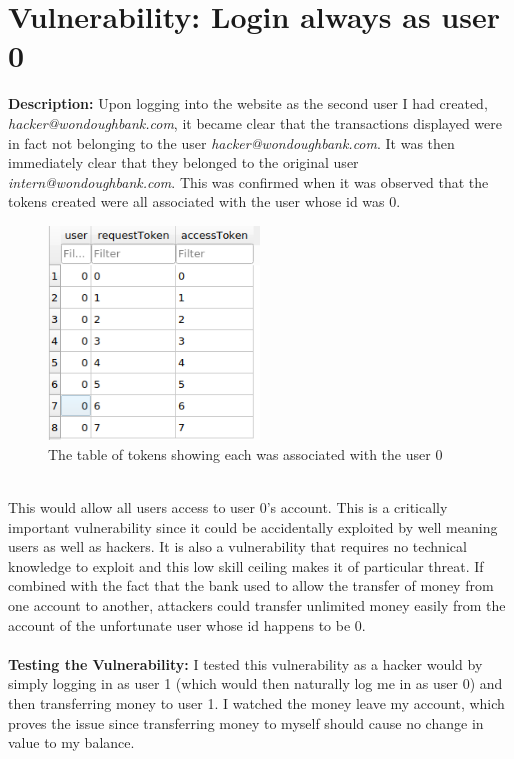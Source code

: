 \section{Vulnerability: Login always as user 0}
\label{sec:background}
\textbf{Description:} Upon logging into the website as the second user I had created, \textit{hacker@wondoughbank.com}, it became clear that the transactions displayed were in fact
not belonging to the user \textit{hacker@wondoughbank.com}. It was then immediately clear that they belonged to the original user \textit{intern@wondoughbank.com}. This was confirmed
when it was observed that the tokens created were all associated with the user whose id was 0.
\begin{figure}[h]
   \centering
   \includegraphics[width=0.5\textwidth]{figs/token1.png}
   \caption{The table of tokens showing each was associated with the user 0}
   \label{fig3}
 \end{figure}\\
This would allow all users access to user 0's account. This is a critically important vulnerability since it could be accidentally exploited by well meaning users as well as hackers.
It is also a vulnerability that requires no technical knowledge to exploit and this low skill ceiling makes it of particular threat. If combined with the fact that the bank used
to allow the transfer of money from one account to another, attackers could transfer unlimited money easily from the account of the unfortunate user whose id happens to be 0.\\ \\
\textbf{Testing the Vulnerability:} I tested this vulnerability as a hacker would by simply logging in as user 1 (which would then naturally log me in as user 0) and then
transferring money to user 1. I watched the money leave my account, which proves the issue since transferring money to myself should cause no change in value to my balance.
